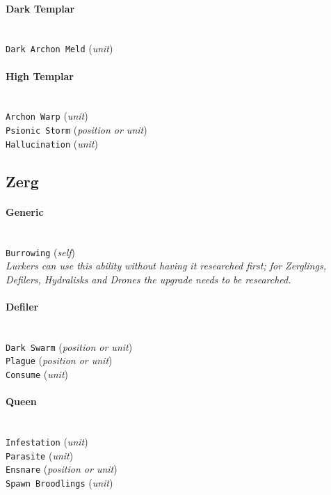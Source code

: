 \paragraph{Dark Templar} \mbox{}\\
\verb|Dark Archon Meld| (\textit{unit})

\paragraph{High Templar} \mbox{}\\
\verb|Archon Warp| (\textit{unit}) \\
\verb|Psionic Storm| (\textit{position or unit}) \\
\verb|Hallucination| (\textit{unit})

\subsection{Zerg}

\paragraph{Generic} \mbox{}\\
\verb|Burrowing| (\textit{self}) \\
\textit{Lurkers can use this ability without having it researched first; for Zerglings, Defilers, Hydralisks and Drones the upgrade needs to be researched.}

\paragraph{Defiler} \mbox{}\\
\verb|Dark Swarm| (\textit{position or unit}) \\
\verb|Plague| (\textit{position or unit}) \\
\verb|Consume| (\textit{unit}) 

\paragraph{Queen} \mbox{}\\
\verb|Infestation| (\textit{unit}) \\
\verb|Parasite| (\textit{unit}) \\
\verb|Ensnare| (\textit{position or unit}) \\
\verb|Spawn Broodlings| (\textit{unit})
